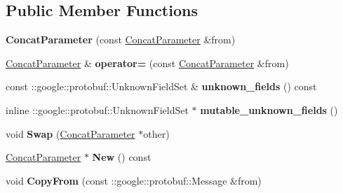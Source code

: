 \subsection*{Public Member Functions}
\begin{DoxyCompactItemize}
\item 
\mbox{\label{classcaffe_1_1_concat_parameter_ab88bffcc112e85b55b511dbadbf9f9a9}} 
{\bfseries Concat\+Parameter} (const \mbox{\hyperlink{classcaffe_1_1_concat_parameter}{Concat\+Parameter}} \&from)
\item 
\mbox{\label{classcaffe_1_1_concat_parameter_a69b81243837437540198bcffd3ace169}} 
\mbox{\hyperlink{classcaffe_1_1_concat_parameter}{Concat\+Parameter}} \& {\bfseries operator=} (const \mbox{\hyperlink{classcaffe_1_1_concat_parameter}{Concat\+Parameter}} \&from)
\item 
\mbox{\label{classcaffe_1_1_concat_parameter_aba8ee3d2129a16a82c8833ac71f4e038}} 
const \+::google\+::protobuf\+::\+Unknown\+Field\+Set \& {\bfseries unknown\+\_\+fields} () const
\item 
\mbox{\label{classcaffe_1_1_concat_parameter_a09912d7d23c103364295f354b4a37f38}} 
inline \+::google\+::protobuf\+::\+Unknown\+Field\+Set $\ast$ {\bfseries mutable\+\_\+unknown\+\_\+fields} ()
\item 
\mbox{\label{classcaffe_1_1_concat_parameter_a75a785aba6876954d3e96be2eb2d031f}} 
void {\bfseries Swap} (\mbox{\hyperlink{classcaffe_1_1_concat_parameter}{Concat\+Parameter}} $\ast$other)
\item 
\mbox{\label{classcaffe_1_1_concat_parameter_a24df769ead16870041e27173c9f8c1ce}} 
\mbox{\hyperlink{classcaffe_1_1_concat_parameter}{Concat\+Parameter}} $\ast$ {\bfseries New} () const
\item 
\mbox{\label{classcaffe_1_1_concat_parameter_ae16099cc82ab0e874e85e0a45429d70c}} 
void {\bfseries Copy\+From} (const \+::google\+::protobuf\+::\+Message \&from)
\item 
\mbox{\label{classcaffe_1_1_concat_parameter_a82a2c3c2d9e59c9b6b0b7c5907f7c1ab}} 

\end{DoxyCompactItemize}
